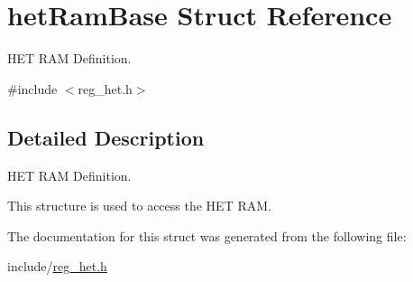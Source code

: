 \hypertarget{structhetRamBase}{}\section{het\+Ram\+Base Struct Reference}
\label{structhetRamBase}


H\+ET R\+AM Definition.  




{\ttfamily \#include $<$reg\+\_\+het.\+h$>$}



\subsection{Detailed Description}
H\+ET R\+AM Definition. 

This structure is used to access the H\+ET R\+AM. 

The documentation for this struct was generated from the following file\+:\begin{DoxyCompactItemize}
\item 
include/\mbox{\hyperlink{reg__het_8h}{reg\+\_\+het.\+h}}\end{DoxyCompactItemize}
